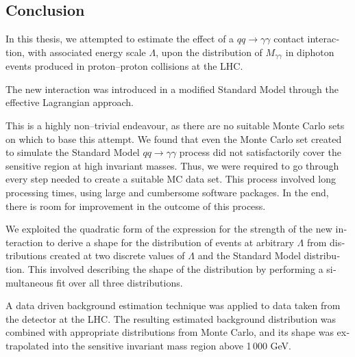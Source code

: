 



%


\begin{english}












\chapter{Conclusion}
In this thesis, we attempted to estimate the effect of a $qq\rightarrow\gamma\gamma$ contact interaction, with associated energy scale $\Lambda$, upon the distribution of $M_{\gamma\gamma}$ in diphoton events produced in proton--proton collisions at the LHC.

The new interaction was introduced in a modified Standard Model through the effective Lagrangian approach.

This is a highly non--trivial endeavour, as there are no suitable \atlas{} Monte Carlo sets on which to base this attempt. We found that even the Monte Carlo set created to simulate the Standard Model $qq\rightarrow\gamma\gamma$ process did not satisfactorily cover the sensitive region at high invariant masses. Thus, we were required to go through every step needed to create a suitable MC data set. This process involved long processing times, using large and cumbersome software packages. In the end, there is room for improvement in the outcome of this process.

We exploited the quadratic form of the expression for the strength of the new interaction to derive a shape for the distribution of events at arbitrary $\Lambda$ from distributions created at two discrete values of $\Lambda$ and the Standard Model distribution. This involved describing the shape of the distribution by performing a simultaneous fit over all three distributions.

A data driven background estimation technique was applied to data taken from the \atlas{} detector at the LHC. The resulting estimated background distribution was combined with appropriate distributions from Monte Carlo, and its shape was extrapolated into the sensitive invariant mass region above 1\,000 GeV.


\end{english}
